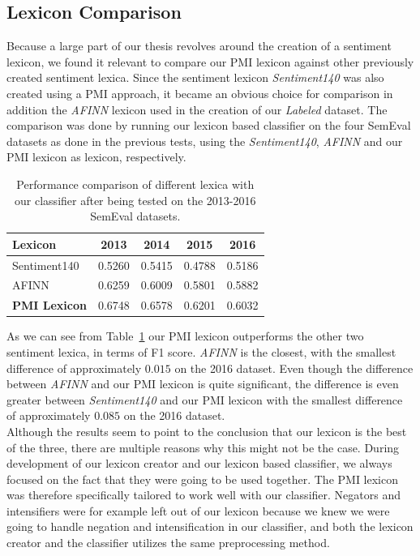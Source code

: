 \subsection{Lexicon Comparison}
\label{sec:lexicon_comparison}
Because a large part of our thesis revolves around the creation of a sentiment lexicon, we found it relevant to compare our PMI lexicon against other previously created sentiment lexica. Since the sentiment lexicon \textit{Sentiment140} was also created using a PMI approach, it became an obvious choice for comparison in addition the \textit{AFINN} lexicon used in the creation of our \textit{Labeled} dataset. The comparison was done by running our lexicon based classifier on the four SemEval datasets as done in the previous tests, using the \textit{Sentiment140}, \textit{AFINN} and our PMI lexicon as lexicon, respectively. \\

\begin{table}[t]
    \centering
    \begin{tabular}{|l|c|c|c|c|}
        \hline
        \textbf{Lexicon} & \textbf{2013} & \textbf{2014} & \textbf{2015} & \textbf{2016} \\ \hline
        Sentiment140            & 0.5260 & 0.5415 & 0.4788 & 0.5186 \\ \hline
        AFINN                   & 0.6259 & 0.6009 & 0.5801 & 0.5882 \\ \hline
        \textbf{PMI Lexicon}    & 0.6748 & 0.6578 & 0.6201 & 0.6032 \\ \hline
    \end{tabular}
    \caption[Performance comparison of different lexica with our classifier]{Performance comparison of different lexica with our classifier after being tested on the 2013-2016 SemEval datasets.}
    \label{tab:lexicon_comparison}   
\end{table}


As we can see from Table~\ref{tab:lexicon_comparison} our PMI lexicon outperforms the other two sentiment lexica, in terms of F1 score. \textit{AFINN} is the closest, with the smallest difference of approximately $0.015$ on the 2016 dataset. Even though the difference between \textit{AFINN} and our PMI lexicon is quite significant, the difference is even greater between \textit{Sentiment140} and our PMI lexicon with the smallest difference of approximately $0.085$ on the 2016 dataset. \\

Although the results seem to point to the conclusion that our lexicon is the best of the three, there are multiple reasons why this might not be the case. During development of our lexicon creator and our lexicon based classifier, we always focused on the fact that they were going to be used together. The PMI lexicon was therefore specifically tailored to work well with our classifier. Negators and intensifiers were for example left out of our lexicon because we knew we were going to handle negation and intensification in our classifier, and both the lexicon creator and the classifier utilizes the same preprocessing method. \\

